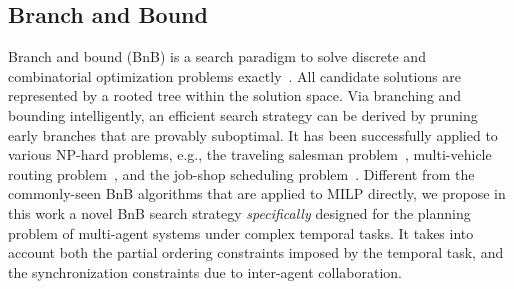 \subsection{Branch and Bound}\label{subsec:BnB-search}
Branch and bound (BnB) is a search paradigm to solve discrete and combinatorial optimization problems exactly~\cite{lawler1966branch, morrison2016branch}.
All candidate solutions are represented by a rooted tree within the solution space.
Via branching and bounding intelligently,
an efficient search strategy can be derived by pruning early branches that are provably
suboptimal. It has been successfully applied to various NP-hard problems, e.g.,
the traveling salesman problem~\cite{junger1995traveling},
multi-vehicle routing problem~\cite{gini2017multi, khamis2015multi},
and the job-shop scheduling problem~\cite{brucker1994branch}.
Different from the commonly-seen BnB algorithms that are applied to MILP directly,
we propose in this work a novel BnB search strategy \emph{specifically} designed
for the planning problem of multi-agent systems under complex temporal tasks.
It takes into account both the partial ordering constraints imposed by the temporal task,
and the synchronization constraints due to inter-agent collaboration.
